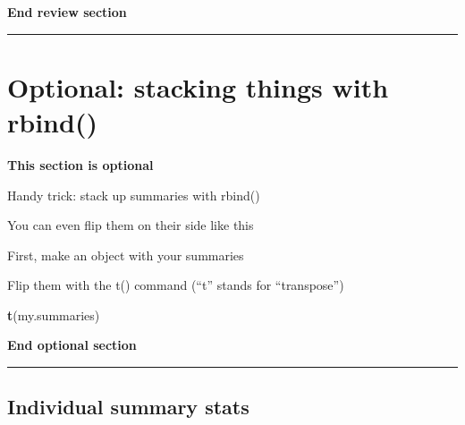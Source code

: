 \documentclass[]{book}
\newenvironment{Shaded}{\begin{snugshade}}{\end{snugshade}}
\newcommand{\KeywordTok}[1]{\textcolor[rgb]{0.13,0.29,0.53}{\textbf{#1}}}
\newcommand{\StringTok}[1]{\textcolor[rgb]{0.31,0.60,0.02}{#1}}
\newcommand{\OperatorTok}[1]{\textcolor[rgb]{0.81,0.36,0.00}{\textbf{#1}}}
\newcommand{\NormalTok}[1]{#1}
\theoremstyle{definition}
\theoremstyle{definition}
\theoremstyle{definition}
\theoremstyle{remark}
\begin{document}
\textbf{End review section}

\begin{center}\rule{0.5\linewidth}{\linethickness}\end{center}

\section{Optional: stacking things with
rbind()}\label{optional-stacking-things-with-rbind}

\textbf{This section is optional}

Handy trick: stack up summaries with rbind()

\begin{Shaded}
\end{Shaded}

You can even flip them on their side like this

First, make an object with your summaries

\begin{Shaded}
\end{Shaded}

Flip them with the t() command (``t'' stands for ``transpose'')

\begin{Shaded}
\begin{Highlighting}[]
\KeywordTok{t}\NormalTok{(my.summaries)}
\end{Highlighting}
\end{Shaded}

\textbf{End optional section}

\begin{center}\rule{0.5\linewidth}{\linethickness}\end{center}

\subsection{Individual summary stats}\label{individual-summary-stats}
\end{document}

